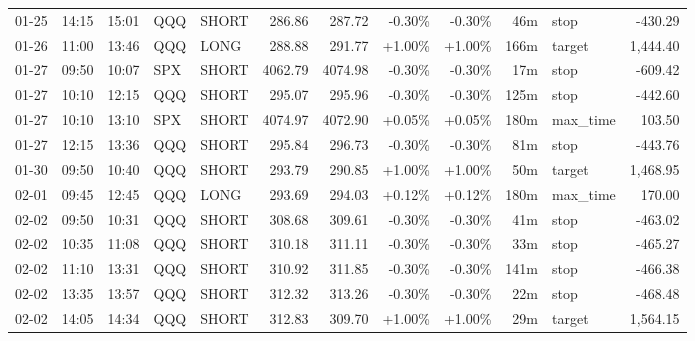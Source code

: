 \documentclass[11pt,a4paper,twoside]{article}
\begin{document}
\begin{center}
\begin{longtable}{>{\color{txtmain}}l l l l l r r r r r >{\color{txtmain}}l r}
01-25 & 14:15 & 15:01 & QQQ & SHORT & 286.86 & 287.72 & \textcolor{lossred}{-0.30\%} & \textcolor{lossred}{-0.30\%} & 46m & stop & \textcolor{lossred}{-430.29} \\
01-26 & 11:00 & 13:46 & QQQ & LONG & 288.88 & 291.77 & \textcolor{wingreen}{+1.00\%} & \textcolor{wingreen}{+1.00\%} & 166m & target & \textcolor{wingreen}{1,444.40} \\
01-27 & 09:50 & 10:07 & SPX & SHORT & 4062.79 & 4074.98 & \textcolor{lossred}{-0.30\%} & \textcolor{lossred}{-0.30\%} & 17m & stop & \textcolor{lossred}{-609.42} \\
01-27 & 10:10 & 12:15 & QQQ & SHORT & 295.07 & 295.96 & \textcolor{lossred}{-0.30\%} & \textcolor{lossred}{-0.30\%} & 125m & stop & \textcolor{lossred}{-442.60} \\
01-27 & 10:10 & 13:10 & SPX & SHORT & 4074.97 & 4072.90 & \textcolor{wingreen}{+0.05\%} & \textcolor{wingreen}{+0.05\%} & 180m & max\_time & \textcolor{wingreen}{103.50} \\
01-27 & 12:15 & 13:36 & QQQ & SHORT & 295.84 & 296.73 & \textcolor{lossred}{-0.30\%} & \textcolor{lossred}{-0.30\%} & 81m & stop & \textcolor{lossred}{-443.76} \\
01-30 & 09:50 & 10:40 & QQQ & SHORT & 293.79 & 290.85 & \textcolor{wingreen}{+1.00\%} & \textcolor{wingreen}{+1.00\%} & 50m & target & \textcolor{wingreen}{1,468.95} \\
02-01 & 09:45 & 12:45 & QQQ & LONG & 293.69 & 294.03 & \textcolor{wingreen}{+0.12\%} & \textcolor{wingreen}{+0.12\%} & 180m & max\_time & \textcolor{wingreen}{170.00} \\
02-02 & 09:50 & 10:31 & QQQ & SHORT & 308.68 & 309.61 & \textcolor{lossred}{-0.30\%} & \textcolor{lossred}{-0.30\%} & 41m & stop & \textcolor{lossred}{-463.02} \\
02-02 & 10:35 & 11:08 & QQQ & SHORT & 310.18 & 311.11 & \textcolor{lossred}{-0.30\%} & \textcolor{lossred}{-0.30\%} & 33m & stop & \textcolor{lossred}{-465.27} \\
02-02 & 11:10 & 13:31 & QQQ & SHORT & 310.92 & 311.85 & \textcolor{lossred}{-0.30\%} & \textcolor{lossred}{-0.30\%} & 141m & stop & \textcolor{lossred}{-466.38} \\
02-02 & 13:35 & 13:57 & QQQ & SHORT & 312.32 & 313.26 & \textcolor{lossred}{-0.30\%} & \textcolor{lossred}{-0.30\%} & 22m & stop & \textcolor{lossred}{-468.48} \\
02-02 & 14:05 & 14:34 & QQQ & SHORT & 312.83 & 309.70 & \textcolor{wingreen}{+1.00\%} & \textcolor{wingreen}{+1.00\%} & 29m & target & \textcolor{wingreen}{1,564.15} \\

\end{longtable}
\end{center}
\end{document}
